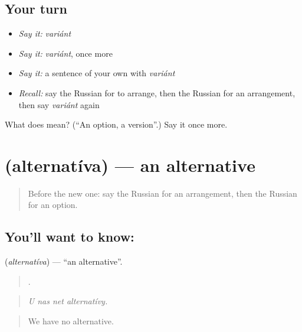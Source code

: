 \subsection*{Your turn}
\begin{itemize}
\raggedright
  \item \emph{Say it:} \emph{variánt}
  \item \emph{Say it:} \emph{variánt}, once more
  \item \emph{Say it:} a sentence of your own with \emph{variánt}
  \item \emph{Recall:} say the Russian for to arrange, then the Russian for an arrangement, then say \emph{variánt} again
\end{itemize}

\begin{tcolorbox}[breakable,colback=teal!4,colframe=teal!35!black,title={Before you move on}]
What does  mean? (\textquotedblleft{}An option, a version\textquotedblright{}.) Say it once more.
\end{tcolorbox}
\section[\texorpdfstring{\ru{альтернатива} (alternatíva)}{альтернатива (alternatíva)}]{ (alternatíva) — an alternative}

\label{lesson:RU-C378-alternativa}



\begin{quote}
Before the new one: say the Russian for an arrangement, then the Russian for an option.
\end{quote}

\subsection*{You'll want to know: }
\textbf{} (\emph{alternatíva}) — \textquotedblleft{}an alternative\textquotedblright{}.

\begin{quote}
   .
\end{quote}

\begin{quote}
\emph{U nas net alternatívy.}
\end{quote}

\begin{quote}
We have no alternative.
\end{quote}

